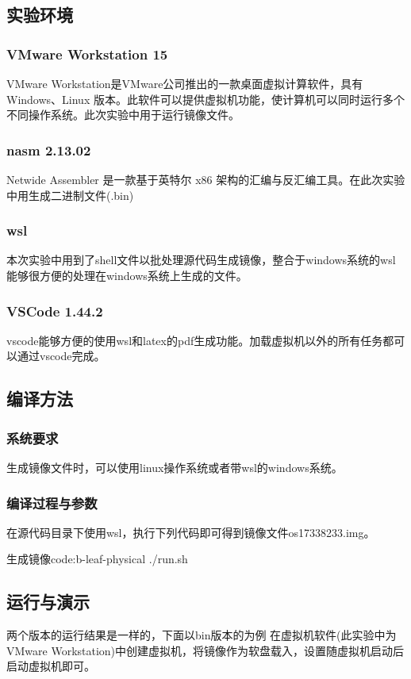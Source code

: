 \documentclass[a4paper, 11pt]{article} %
\newcounter{code}
\begin{document}
\subsection{实验环境}

\subsubsection{VMware Workstation 15}
VMware Workstation是VMware公司推出的一款桌面虚拟计算软件，具有Windows、Linux 版本。此软件可以提供虚拟机功能，使计算机可以同时运行多个不同操作系统。此次实验中用于运行镜像文件。
\subsubsection{nasm 2.13.02}
Netwide Assembler 是一款基于英特尔 x86 架构的汇编与反汇编工具。在此次实验中用生成二进制文件(.bin)
\subsubsection{wsl}
本次实验中用到了shell文件以批处理源代码生成镜像，整合于windows系统的wsl能够很方便的处理在windows系统上生成的文件。
\subsubsection{VSCode 1.44.2}
vscode能够方便的使用wsl和latex的pdf生成功能。加载虚拟机以外的所有任务都可以通过vscode完成。

\subsection{编译方法}

\subsubsection{系统要求}

生成镜像文件时，可以使用linux操作系统或者带wsl的windows系统。

\subsubsection{编译过程与参数}

在源代码目录下使用wsl，执行下列代码即可得到镜像文件os17338233.img。
\begin{code}{生成镜像}{code:b-leaf-physical}
  ./run.sh
\end{code}

\subsection{运行与演示}
两个版本的运行结果是一样的，下面以bin版本的为例
在虚拟机软件(此实验中为VMware Workstation)中创建虚拟机，将镜像作为软盘载入，设置随虚拟机启动后启动虚拟机即可。
\end{document}
